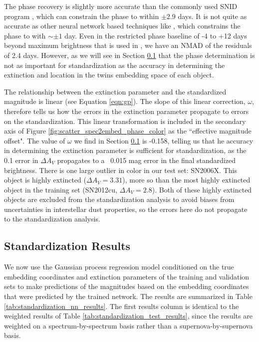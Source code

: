 The phase recovery is slightly more accurate than the commonly used SNID program \citep{blondin_determining_2007}, which can constrain the phase to within $\pm 2.9$ days. It is not quite as accurate as other neural network based techniques like \citet{stahl_deepsip_2020}, which constrains the phase to with $\sim\pm 1$ day. Even in the restricted phase baseline of -4 to +12 days beyond maximum brightness that is used in \citet{stahl_deepsip_2020}, we have an NMAD of the residuals of 2.4 days. However, as we will see in Section \ref{sec:standardization} that the phase determination is not as important for standardization as the accuracy in determining the extinction and location in the twins embedding space of each object. 

The relationship between the extinction parameter and the standardized magnitude is linear (see Equation \ref{eqn:gp}). The slope of this linear correction, $\omega$, therefore tells us how the errors in the extinction parameter propagate to errors on the standardization. This linear transformation is included in the secondary axis of Figure \ref{fig:scatter_spec2embed_phase_color} as the ``effective magnitude offset". The value of $\omega$ we find in Section \ref{sec:standardization} is -0.158, telling us that he accuracy in determining the extinction parameter is sufficient for standardization, as the 0.1 error in $\Delta A_V$ propagates to a ~0.015 mag error in the final standardized brightness. There is one large outlier in color in our test set: SN2006X. This object is highly extincted ($\Delta A_V=3.31$), more so than the most highly extincted object in the training set (SN2012cu, $\Delta A_V=2.8$). Both of these highly extincted objects are excluded from the standardization analysis to avoid biases from uncertainties in interstellar dust properties, so the errors here do not propagate to the standardization analysis.

\subsection{Standardization Results} 
\label{sec:standardization}
We now use the Gaussian process regression model conditioned on the true embedding coordinates and extinction parameters of the training and validation sets to make predictions of the magnitudes based on the embedding coordinates that were predicted by the trained \stoe{} network. The results are summarized in Table \ref{tab:standardization_nn_results}. The first results column is identical to the weighted results of Table \ref{tab:standardization_test_results}, since the results are weighted on a spectrum-by-spectrum basis rather than a supernova-by-supernova basis.

